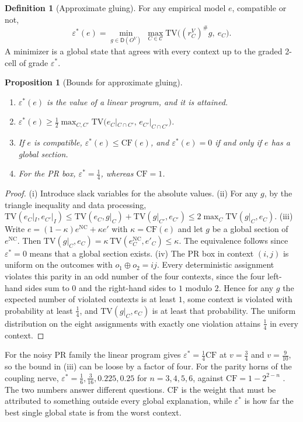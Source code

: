 \documentclass[11pt]{article}
\newtheorem{proposition}[theorem]{Proposition}
\theoremstyle{definition}
\newtheorem{definition}[theorem]{Definition}
\theoremstyle{remark}
\newcommand{\D}{\mathsf{D}}
\newcommand{\TV}{\mathrm{TV}}
\begin{document}
\begin{definition}[Approximate gluing]\label{def:epsstar}
For any empirical model $e$, compatible or not,
\[
\varepsilon^*(e)=\min_{g\in\D(O^V)}\ \max_{C\in\mathcal C}\TV\big((r^V_C)^\#g,\ e_C\big).
\]
A minimizer is a global state that agrees with every context up to the graded 2-cell of grade
$\varepsilon^*$.
\end{definition}

\begin{proposition}[Bounds for approximate gluing]\label{prop:epsstar}
\leavevmode
\begin{enumerate}[label=(\roman*)]
\item $\varepsilon^*(e)$ is the value of a linear program, and it is attained.
\item $\varepsilon^*(e)\ge\tfrac12\max_{C,C'}\TV\big(e_C|_{C\cap C'},\,e_{C'}|_{C\cap C'}\big)$.
\item If $e$ is compatible, $\varepsilon^*(e)\le\mathrm{CF}(e)$, and $\varepsilon^*(e)=0$ if and only if
  $e$ has a global section.
\item For the PR box, $\varepsilon^*=\tfrac14$, whereas $\mathrm{CF}=1$.
\end{enumerate}
\end{proposition}
\begin{proof}
(i) Introduce slack variables for the absolute values. (ii) For any $g$, by the triangle inequality and
data processing,
$\TV(e_C|_I,e_{C'}|_I)\le\TV(e_C,g|_C)+\TV(g|_{C'},e_{C'})\le2\max_C\TV(g|_C,e_C)$.
(iii) Write $e=(1-\kappa)e^{\mathrm{NC}}+\kappa e'$ with $\kappa=\mathrm{CF}(e)$ and let $g$ be a global
section of $e^{\mathrm{NC}}$. Then $\TV(g|_C,e_C)=\kappa\,\TV(e^{\mathrm{NC}}_C,e'_C)\le\kappa$. The
equivalence follows since $\varepsilon^*=0$ means that a global section exists.
(iv) The PR box in context $(i,j)$ is uniform on the outcomes with $o_1\oplus o_2=ij$. Every deterministic
assignment violates this parity in an odd number of the four contexts, since the four left-hand
sides sum to $0$ and the right-hand sides to $1$ modulo $2$. Hence for any $g$ the expected number of
violated contexts is at least $1$, some context is violated with probability at least $\tfrac14$, and
$\TV(g|_C,e_C)$ is at least that probability. The uniform distribution on the eight assignments with
exactly one violation attains $\tfrac14$ in every context.
\end{proof}

For the noisy PR family the linear program gives $\varepsilon^*=\tfrac14\mathrm{CF}$ at $v=\tfrac34$ and
$v=\tfrac9{10}$, so the bound in (iii) can be loose by a factor of four. For the parity horns of the coupling nerve,
$\varepsilon^*=\tfrac16,\tfrac3{16},0.225,0.25$ for $n=3,4,5,6$, against $\mathrm{CF}=1-2^{2-n}$
\cite[\S13.1]{Awasthi-Family}. The two numbers answer
different questions. $\mathrm{CF}$ is the weight that must be attributed to something outside every
global explanation, while $\varepsilon^*$ is how far the best single global state is from the worst
context.
\end{document}
